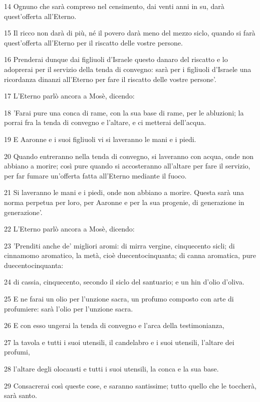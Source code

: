 \par 14 Ognuno che sarà compreso nel censimento, dai venti anni in su, darà quest'offerta all'Eterno.
\par 15 Il ricco non darà di più, né il povero darà meno del mezzo siclo, quando si farà quest'offerta all'Eterno per il riscatto delle vostre persone.
\par 16 Prenderai dunque dai figliuoli d'Israele questo danaro del riscatto e lo adoprerai per il servizio della tenda di convegno: sarà per i figliuoli d'Israele una ricordanza dinanzi all'Eterno per fare il riscatto delle vostre persone'.
\par 17 L'Eterno parlò ancora a Mosè, dicendo:
\par 18 'Farai pure una conca di rame, con la sua base di rame, per le abluzioni; la porrai fra la tenda di convegno e l'altare, e ci metterai dell'acqua.
\par 19 E Aaronne e i suoi figliuoli vi si laveranno le mani e i piedi.
\par 20 Quando entreranno nella tenda di convegno, si laveranno con acqua, onde non abbiano a morire; così pure quando si accosteranno all'altare per fare il servizio, per far fumare un'offerta fatta all'Eterno mediante il fuoco.
\par 21 Si laveranno le mani e i piedi, onde non abbiano a morire. Questa sarà una norma perpetua per loro, per Aaronne e per la sua progenie, di generazione in generazione'.
\par 22 L'Eterno parlò ancora a Mosè, dicendo:
\par 23 'Prenditi anche de' migliori aromi: di mirra vergine, cinquecento sicli; di cinnamomo aromatico, la metà, cioè duecentocinquanta; di canna aromatica, pure duecentocinquanta:
\par 24 di cassia, cinquecento, secondo il siclo del santuario; e un hin d'olio d'oliva.
\par 25 E ne farai un olio per l'unzione sacra, un profumo composto con arte di profumiere: sarà l'olio per l'unzione sacra.
\par 26 E con esso ungerai la tenda di convegno e l'arca della testimonianza,
\par 27 la tavola e tutti i suoi utensili, il candelabro e i suoi utensili, l'altare dei profumi,
\par 28 l'altare degli olocausti e tutti i suoi utensili, la conca e la sua base.
\par 29 Consacrerai così queste cose, e saranno santissime; tutto quello che le toccherà, sarà santo.
